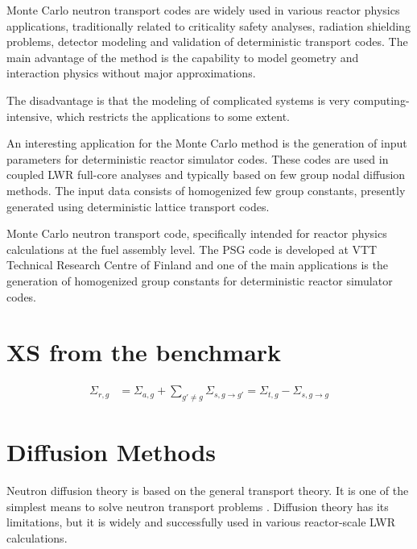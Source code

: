 \documentclass[11pt,letterpaper]{article}
\begin{document}
Monte Carlo neutron transport codes are widely used in various reactor physics
applications, traditionally related to criticality safety analyses, radiation
shielding problems, detector modeling and validation of deterministic transport
codes.
The main advantage of the method is the capability to model geometry and interaction physics without major approximations.

The disadvantage is that the modeling of complicated systems is very computing-intensive, which
restricts the applications to some extent.

An interesting application for the Monte Carlo method is the generation of input parameters for deterministic reactor simulator codes.
These codes are used in coupled LWR full-core analyses and typically based on few group nodal diffusion methods.
The input data consists of homogenized few group constants, presently generated using deterministic lattice transport codes.

Monte Carlo neutron transport code, specifically intended for reactor physics calculations at the fuel assembly level.
The PSG code is developed at VTT Technical Research Centre of Finland and one of the main applications is the generation of homogenized group constants for deterministic reactor simulator codes.

\cite{leppanen_development_2007}

\section{XS from the benchmark}

\begin{align}
\Sigma_{r,g} &= \Sigma_{a,g} + \sum_{g' \ne g} \Sigma_{s,g \rightarrow g'} = \Sigma_{t,g} - \Sigma_{s, g \rightarrow g}
\label{eq:removal}
\end{align}

\section{Diffusion Methods}

Neutron diffusion theory is based on the general transport theory.
It is one of the simplest means to solve neutron transport problems \cite{leppanen_development_2007}.
Diffusion theory has its limitations, but it is widely and successfully used in various reactor-scale LWR calculations.
\end{document}
